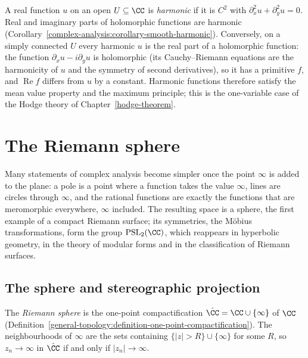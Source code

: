 \begin{remark}\label{complex-analysis:remark-harmonic}
A real function $u$ on an open $U \subseteq \CC$ is \emph{harmonic} if it is $C^2$ with $\partial_x^2u + \partial_y^2u = 0$. Real and imaginary parts of holomorphic functions are harmonic
(Corollary~\ref{complex-analysis:corollary-smooth-harmonic}). Conversely, on a simply connected $U$ every harmonic $u$ is the real part of a holomorphic function: the function
$\partial_xu - i\partial_yu$ is holomorphic (its Cauchy--Riemann equations are the harmonicity of $u$ and the symmetry of second derivatives), so it has a primitive $f$, and $\operatorname{Re}f$ differs from
$u$ by a constant. Harmonic functions therefore satisfy the mean value property and the maximum principle; this is the one-variable case of the Hodge theory of Chapter~\ref{hodge-theorem}.
\end{remark}

\section{The Riemann sphere}\label{complex-analysis:section-riemann-sphere}

Many statements of complex analysis become simpler once the point $\infty$ is added to the plane: a pole is a point where a function takes the value $\infty$, lines are circles through $\infty$,
and the rational functions are exactly the functions that are meromorphic everywhere, $\infty$ included. The resulting space is a sphere, the first example of a compact Riemann surface; its
symmetries, the M\"obius transformations, form the group $\mathrm{PSL}_2(\CC)$, which reappears in hyperbolic geometry, in the theory of modular forms and in the classification of Riemann surfaces.

\subsection{The sphere and stereographic projection}\label{complex-analysis:subsection-sphere}

\begin{definition}\label{complex-analysis:definition-riemann-sphere}
The \emph{Riemann sphere} is the one-point compactification $\hat{\CC} = \CC \cup \{\infty\}$ of $\CC$ (Definition~\ref{general-topology:definition-one-point-compactification}). The neighbourhoods of $\infty$ are the sets
containing $\{|z| > R\} \cup \{\infty\}$ for some $R$, so $z_n \to \infty$ in $\hat{\CC}$ if and only if $|z_n| \to \infty$.
\end{definition}


